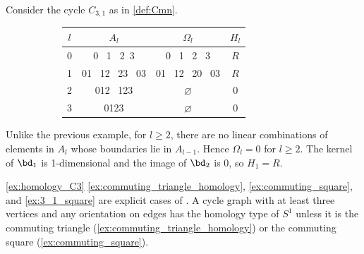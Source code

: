\begin{example}\label{ex:3_1_square}
Consider the cycle $C_{3,1}$ as in \cref{def:Cmn}.

    \begin{figure}[H]
        \centering
        \begin{subfigure}[c]{0.3\textwidth}
        \end{subfigure}
        \begin{subfigure}[c]{0.6\textwidth}
        \centering
        \begin{tabular}{||c||  c | c | c ||} 
         \hline
         $l$ &  $A_l$ & $\Omega_l$ & $H_l$ \\ [.5ex] 
         \hline\hline
        0 &  0 \, 1 \, 2 \,3 & 0 \, 1 \, 2 \, 3 & $R$ \\ 
         \hline
         1 &  01 \, 12 \, 23 \, 03 & 01 \, 12 \, 20 \,  03 & $R$ \\
         \hline
          2 & 012 \, 123 & $\varnothing$ & $0$ \\
         \hline
          3 & 0123 & $\varnothing$ & 0\\
         \hline
        \end{tabular}
        \end{subfigure}
    \end{figure}  Unlike the previous example, for $l\geq 2$, there are no linear combinations of elements in $A_l$ whose boundaries lie in $A_{l-1}$.
Hence $\Omega_l = 0$ for $l \geq 2$.
The kernel of $\bd_1$ is 1-dimensional and the image of $\bd_2$ is $0$, so $H_1 = R$.
\end{example}

\begin{remark}\label{rmk:homology_cycles}  \cref{ex:homology_C3} \cref{ex:commuting_triangle_homology}, \cref{ex:commuting_square}, and \cref{ex:3_1_square} are explicit cases of \cite[Prop.~4.3]{grigor'yan-lin-muranov-yau}.
A cycle graph with at least three vertices and any orientation on edges has the homology type of $S^1$ unless it is the commuting triangle (\cref{ex:commuting_triangle_homology}) or the commuting square (\cref{ex:commuting_square}).
\end{remark}

